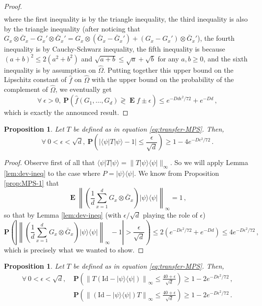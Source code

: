 \documentclass{amsart}
\newtheorem{proposition}[theorem]{Proposition}
\renewcommand{\P}{\mathbf{P}}
\renewcommand{\leq}{\leqslant}
\renewcommand{\geq}{\geqslant}
\newcommand{\Id}{\mathrm{Id}}
\DeclareMathOperator{\E}{\mathbf{E}}
\newcommand{\ketbra}[2]{| #1 \rangle\!\langle #2 |}
\newcommand{\bra}[1]{\langle #1 |}
\newcommand{\ket}[1]{| #1 \rangle}
\begin{document}
\begin{proof}
\begin{align*}
    \end{align*}
    where the first inequality is by the triangle inequality, the third inequality is also by the triangle inequality (after noticing that $G_x\otimes\bar{G}_x-G_x'\otimes\bar{G}_x'=G_x\otimes(\bar{G}_x-\bar{G}_x')+(G_x-G_x')\otimes\bar{G}_x'$), the fourth inequality is by Cauchy-Schwarz inequality, the fifth inequality is because $(a+b)^2\leq 2(a^2+b^2)$ and $\sqrt{a+b}\leq\sqrt{a}+\sqrt{b}$ for any $a,b\geq 0$, and the sixth inequality is by assumption on $\hat{\Omega}$. Putting together this upper bound on the Lipschitz constant of $\hat{f}$ on $\hat{\Omega}$ with the upper bound on the probability of the complement of $\hat{\Omega}$, we eventually get
    \[ \forall\ \epsilon>0,\ \P\left( \hat{f}(G_1,\ldots,G_d) \gtrless \E \hat{f} \pm \epsilon \right) \leq e^{-Dd\epsilon^2/72}+e^{-Dd} \, , \]
    which is exactly the announced result.
\end{proof}

\begin{proposition} \label{prop:MPS-1'}
    Let $T$ be defined as in equation \eqref{eq:transfer-MPS}. Then,
    \[ \forall\ 0<\epsilon<\sqrt{d},\ \P \left( \left| \bra{\psi}T\ket{\psi} - 1 \right| \leq \frac{\epsilon}{\sqrt{d}} \right) \geq 1- 4e^{-D\epsilon^2/72} \, . \]
\end{proposition}

\begin{proof}
    Observe first of all that $\bra{\psi}T\ket{\psi}=\|T\ketbra{\psi}{\psi}\|_{\infty}$. So we will apply Lemma \ref{lem:dev-ineq} to the case where $P=\ketbra{\psi}{\psi}$.
    We know from Proposition \ref{prop:MPS-1} that
    \[ \E\left\| \left(\frac{1}{d}\sum_{x=1}^dG_x\otimes\bar{G}_x\right)\ketbra{\psi}{\psi} \right\|_{\infty} = 1 \, , \]
    so that by Lemma \ref{lem:dev-ineq} (with $\epsilon/\sqrt{d}$ playing the role of $\epsilon$)
    \[ \P\left( \left| \left\| \left(\frac{1}{d}\sum_{x=1}^dG_x\otimes\bar{G}_x\right)\ketbra{\psi}{\psi} \right\|_{\infty} - 1 \right| > \frac{\epsilon}{\sqrt{d}} \right) \leq 2\left(e^{-D\epsilon^2/72}+e^{-Dd}\right) \leq 4e^{-D\epsilon^2/72} \, , \]
    which is precisely what we wanted to show.
\end{proof}

\begin{proposition} \label{prop:MPS-2'}
    Let $T$ be defined as in equation \eqref{eq:transfer-MPS}. Then,
    \begin{align*}
        \forall\ 0<\epsilon<\sqrt{d}, & \ \P\left( \left\|T\left(\Id-\ketbra{\psi}{\psi}\right) \right\|_{\infty} \leq \frac{40+\epsilon}{\sqrt{d}} \right) \geq 1-2e^{-D\epsilon^2/72} \, , \\
                                      & \ \P\left( \left\|\left(\Id-\ketbra{\psi}{\psi}\right)T \right\|_{\infty} \leq \frac{40+\epsilon}{\sqrt{d}} \right) \geq 1-2e^{-D\epsilon^2/72} \, .
    \end{align*}
\end{proposition}
\end{document}
